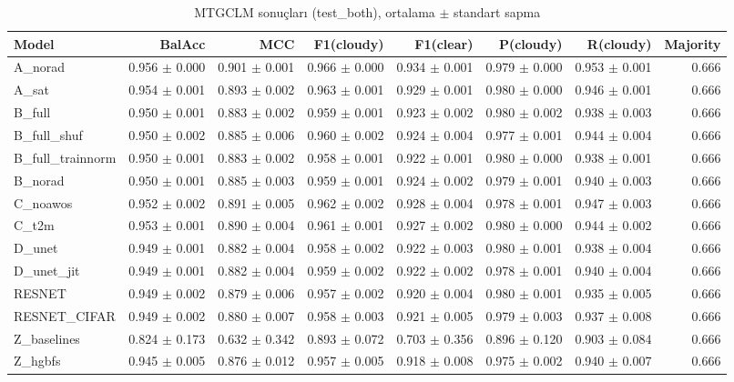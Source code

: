 \begin{table}[ht]
\centering
\caption{MTGCLM sonuçları (test_both), ortalama $\pm$ standart sapma}
\label{tab:results_test_both}
\begin{tabular}{lrrrrrrr}
\hline
Model & BalAcc & MCC & F1(cloudy) & F1(clear) & P(cloudy) & R(cloudy) & Majority \\
\hline
A\_norad & 0.956 $\pm$ 0.000 & 0.901 $\pm$ 0.001 & 0.966 $\pm$ 0.000 & 0.934 $\pm$ 0.001 & 0.979 $\pm$ 0.000 & 0.953 $\pm$ 0.001 & 0.666 \\
A\_sat & 0.954 $\pm$ 0.001 & 0.893 $\pm$ 0.002 & 0.963 $\pm$ 0.001 & 0.929 $\pm$ 0.001 & 0.980 $\pm$ 0.000 & 0.946 $\pm$ 0.001 & 0.666 \\
B\_full & 0.950 $\pm$ 0.001 & 0.883 $\pm$ 0.002 & 0.959 $\pm$ 0.001 & 0.923 $\pm$ 0.002 & 0.980 $\pm$ 0.002 & 0.938 $\pm$ 0.003 & 0.666 \\
B\_full\_shuf & 0.950 $\pm$ 0.002 & 0.885 $\pm$ 0.006 & 0.960 $\pm$ 0.002 & 0.924 $\pm$ 0.004 & 0.977 $\pm$ 0.001 & 0.944 $\pm$ 0.004 & 0.666 \\
B\_full\_trainnorm & 0.950 $\pm$ 0.001 & 0.883 $\pm$ 0.002 & 0.958 $\pm$ 0.001 & 0.922 $\pm$ 0.001 & 0.980 $\pm$ 0.000 & 0.938 $\pm$ 0.001 & 0.666 \\
B\_norad & 0.950 $\pm$ 0.001 & 0.885 $\pm$ 0.003 & 0.959 $\pm$ 0.001 & 0.924 $\pm$ 0.002 & 0.979 $\pm$ 0.001 & 0.940 $\pm$ 0.003 & 0.666 \\
C\_noawos & 0.952 $\pm$ 0.002 & 0.891 $\pm$ 0.005 & 0.962 $\pm$ 0.002 & 0.928 $\pm$ 0.004 & 0.978 $\pm$ 0.001 & 0.947 $\pm$ 0.003 & 0.666 \\
C\_t2m & 0.953 $\pm$ 0.001 & 0.890 $\pm$ 0.004 & 0.961 $\pm$ 0.001 & 0.927 $\pm$ 0.002 & 0.980 $\pm$ 0.000 & 0.944 $\pm$ 0.002 & 0.666 \\
D\_unet & 0.949 $\pm$ 0.001 & 0.882 $\pm$ 0.004 & 0.958 $\pm$ 0.002 & 0.922 $\pm$ 0.003 & 0.980 $\pm$ 0.001 & 0.938 $\pm$ 0.004 & 0.666 \\
D\_unet\_jit & 0.949 $\pm$ 0.001 & 0.882 $\pm$ 0.004 & 0.959 $\pm$ 0.002 & 0.922 $\pm$ 0.002 & 0.978 $\pm$ 0.001 & 0.940 $\pm$ 0.004 & 0.666 \\
RESNET & 0.949 $\pm$ 0.002 & 0.879 $\pm$ 0.006 & 0.957 $\pm$ 0.002 & 0.920 $\pm$ 0.004 & 0.980 $\pm$ 0.001 & 0.935 $\pm$ 0.005 & 0.666 \\
RESNET\_CIFAR & 0.949 $\pm$ 0.002 & 0.880 $\pm$ 0.007 & 0.958 $\pm$ 0.003 & 0.921 $\pm$ 0.005 & 0.979 $\pm$ 0.003 & 0.937 $\pm$ 0.008 & 0.666 \\
Z\_baselines & 0.824 $\pm$ 0.173 & 0.632 $\pm$ 0.342 & 0.893 $\pm$ 0.072 & 0.703 $\pm$ 0.356 & 0.896 $\pm$ 0.120 & 0.903 $\pm$ 0.084 & 0.666 \\
Z\_hgbfs & 0.945 $\pm$ 0.005 & 0.876 $\pm$ 0.012 & 0.957 $\pm$ 0.005 & 0.918 $\pm$ 0.008 & 0.975 $\pm$ 0.002 & 0.940 $\pm$ 0.007 & 0.666 \\
\hline
\end{tabular}
\end{table}

